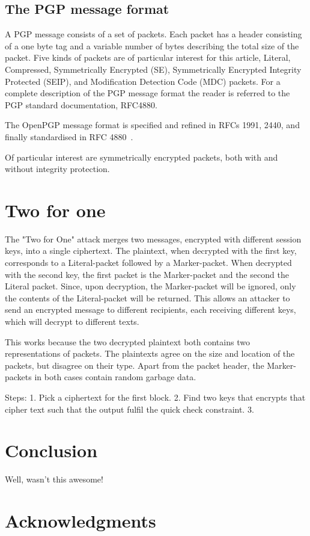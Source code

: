 \documentclass[runningheads,a4paper]{llncs}[2018/03/10]
\newif\ifanon
\begin{document}
\subsection{The PGP message format}

A PGP message consists of a set of packets. Each packet has a header consisting 
of a one byte tag and a variable
number of bytes describing the total size of the packet. Five kinds of
packets are of particular interest for this article, Literal,
Compressed, Symmetrically Encrypted (SE), Symmetrically Encrypted
Integrity Protected (SEIP), and Modification Detection Code (MDC)
packets. For a complete description of the PGP message format the
reader is referred to the PGP standard documentation, RFC4880.

The OpenPGP message format is specified and refined in RFCs 1991,
2440, and finally standardised in RFC
4880~\cite{callas1998rfc,callas2007openpgp}.

Of particular interest are symmetrically encrypted packets, both with
and without integrity protection.


\section{Two for one}\label{sec:twoforone}

The "Two for One" attack merges two messages, encrypted with different session keys, 
into a single ciphertext. The plaintext, when decrypted with the first key, 
corresponds to a Literal-packet followed by a Marker-packet. When decrypted with the second 
key, the first packet is the Marker-packet and the second the Literal packet. 
Since, upon decryption, the Marker-packet will be ignored, only the contents of the Literal-packet will be returned. This allows an attacker to send an encrypted message to different recipients, each receiving different keys, which will decrypt to different texts.


This works because the two decrypted plaintext both contains two representations 
of packets. The plaintexts agree on the size and location of the packets, but 
disagree on their type. Apart 
from the packet header, the Marker-packets in both cases contain random garbage 
data. 

Steps:
1. Pick a ciphertext for the first block.
2. Find two keys that encrypts that cipher text such that the output fulfil the quick check constraint.
3.

\section{Conclusion}\label{sec:conclusion}
Well, wasn't this awesome!

\section*{Acknowledgments}
\ifanon
	Removed for blind review.
\else
	
\fi

\clearpage



\end{document}
